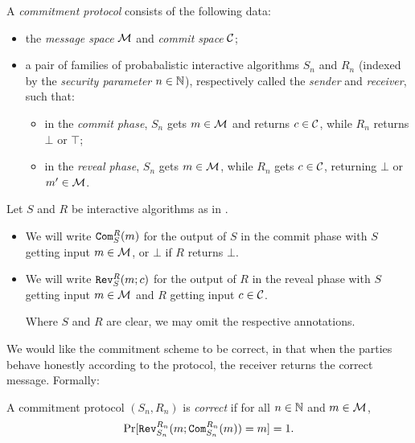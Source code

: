 \begin{dfn}\label{def:commitment protocol}
	A \emph{commitment protocol} consists of the following data:
	\begin{itemize}
		\item the \emph{message space} $\mathcal{M}$ and \emph{commit space} $\mathcal{C}$;
		\item a pair of families of probabalistic interactive algorithms
		      $S_n$ and $R_n$ (indexed by the
		      \emph{security parameter} $n\in\mathbb{N}$), respectively called the \emph{sender}
		      and \emph{receiver}, such that:
		      \begin{itemize}
			      \item in the \emph{commit phase}, $S_n$ gets $m\in\mathcal{M}$ and returns
			            $c\in\mathcal{C}$, while $R_n$ returns $\bot$ or $\top$;
			      \item in the \emph{reveal phase}, $S_n$ gets $m\in\mathcal{M}$, while $R_n$
			            gets $c\in\mathcal{C}$, returning $\bot$ or $m'\in\mathcal{M}$.
		      \end{itemize}
	\end{itemize}
\end{dfn}

\begin{ntn}
	Let $S$ and $R$ be interactive algorithms as in .\begin{itemize}
		\item	We will write ${\texttt{Com}}_S^R(m)$ for the output of $S$
		      in the commit phase with $S$ getting input $m\in\mathcal{M}$, or $\bot$ if $R$
		      returns $\bot$.
		\item We will write ${\texttt{Rev}}_S^R(m; c)$
		      for the output of $R$ in the reveal phase with $S$ getting input
		      $m\in\mathcal{M}$ and $R$ getting input $c\in\mathcal{C}$.

		      Where $S$ and $R$ are clear, we may omit the respective annotations.
	\end{itemize}
\end{ntn}

\noindent
We would like the commitment scheme to be correct, in that when the parties
behave honestly according to the protocol, the receiver returns the correct
message. Formally:
\begin{dfn}
	A commitment protocol $(S_n,R_n)$ is \emph{correct} if for all $n\in\mathbb{N}$ and
	$m\in\mathcal{M}$, \[
		\Pr[{\texttt{Rev}}_{S_n}^{R_n}(m; {\texttt{Com}}_{S_n}^{R_n}(m)) = m] = 1.
	\]
\end{dfn}

